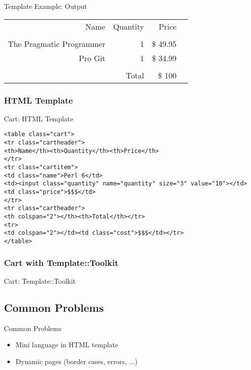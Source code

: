 \begin{frame}{Template Example: Output}
\begin{tabular}[t]{rrrr}
\hfill Name & Quantity & Price \\
\hfill & & \\
\hfill The Pragmatic Programmer & 1 & \$ 49.95 \\
\hfill Pro Git & 1 & \$ 34.99 \\
\hfill & & \\
\hfill & Total & \$ 100
\end{tabular}
\end{frame}

\subsubsection{HTML Template}
\begin{frame}[fragile]{Cart: HTML Template}
\begin{lstlisting}
<table class="cart">
<tr class="cartheader">
<th>Name</th><th>Quantity</th><th>Price</th>
</tr>
<tr class="cartitem">
<td class="name">Perl 6</td>
<td><input class="quantity" name="quantity" size="3" value="10"></td>
<td class="price">$$$</td>
</tr>
<tr class="cartheader">
<th colspan="2"></th><th>Total</th></tr>
<tr>
<td colspan="2"></td><td class="cost">$$$</td></tr>
</table>
\end{lstlisting}
\end{frame}

\subsubsection{Cart with Template::Toolkit}
\begin{frame}[fragile]{Cart: Template::Toolkit}

\end{frame}

\subsection{Common Problems}
\begin{frame}{Common Problems}
 \begin{itemize}
  \item Mini language in HTML template
  \item Dynamic pages (border cases, errors, ...)
 \end{itemize}
\end{frame}

